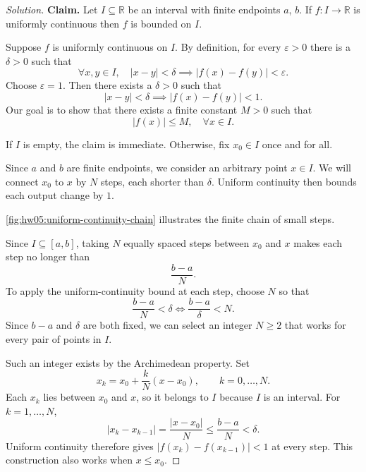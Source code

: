 \begin{proof}[Solution]

\textbf{Claim.} Let $I\subseteq \mathbb{R}$ be an interval with finite endpoints $a$, $b$. If
$f: I \rightarrow \mathbb{R}$ is uniformly continuous then $f$ is bounded on $I$.

Suppose $f$ is uniformly continuous on $I$. By definition, for every
$\varepsilon > 0$ there is a $\delta > 0$ such that
\[
\forall x,y \in I,\quad |x - y| < \delta \implies |f(x) - f(y)| < \varepsilon.
\]
Choose $\varepsilon = 1$. Then there exists a $\delta > 0$ such that
\[
|x - y| < \delta \implies |f(x) - f(y)| < 1.
\]
Our goal is to show that there exists a finite constant $M > 0$ such that
\[
|f(x)| \le M,\quad \forall x \in I.
\]

If $I$ is empty, the claim is immediate. Otherwise, fix $x_0\in I$ once
and for all.

Since $a$ and $b$ are finite endpoints, we consider
an arbitrary point $x\in I$.
We will connect $x_0$ to $x$ by $N$ steps, each shorter
than $\delta$. Uniform continuity then bounds each output change by $1$.

\autoref{fig:hw05:uniform-continuity-chain} illustrates
the finite chain of small steps.

\begin{marginfigure}
  \centering
  
  \caption[Chaining small steps across a bounded interval.]{%
    A schematic chain inside $I$, with the open-interval
    case shown. Every successive gap is less than $\delta$, so each
    corresponding output change is less than $1$. The dots omit
    intermediate steps in the finite chain.}
  \label{fig:hw05:uniform-continuity-chain}
\end{marginfigure}

Since $I\subseteq[a,b]$, taking $N$ equally spaced steps
between $x_0$ and $x$ makes each step no longer than
\[
\dfrac{b - a}{N}.
\]
To apply the uniform-continuity bound at each step,
choose $N$ so that
\[
\dfrac{b - a}{N} < \delta \iff \dfrac{b - a}{\delta} < N.
\]
Since $b - a$ and $\delta$ are both fixed, we can select
an integer $N\ge2$ that
works for every pair of points in $I$.

Such an integer exists by the Archimedean property. Set
\[
  x_k=x_0+\frac{k}{N}(x-x_0),\qquad k=0,\ldots,N.
\]
Each $x_k$ lies between $x_0$ and $x$, so it belongs to $I$ because $I$
is an interval. For $k=1,\ldots,N$,
\[
  |x_k-x_{k-1}|=\frac{|x-x_0|}{N}
  \le\frac{b-a}{N}<\delta.
\]
Uniform continuity therefore gives $|f(x_k)-f(x_{k-1})|<1$ at every
step. This construction also works when $x\le x_0$.




\end{proof}
